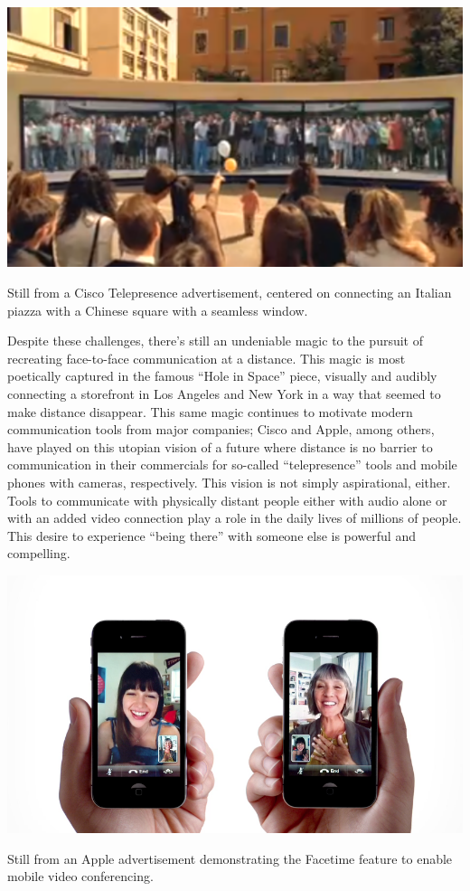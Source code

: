 \documentclass{tufte-handout}
\begin{document}
\begin{marginfigure}
	\includegraphics{figures/cisco-telepresence.png}
	\caption{Still from a Cisco Telepresence advertisement, centered on connecting an Italian piazza with a Chinese square with a seamless window.}
	\label{fig:cisco-telepresence}
\end{marginfigure}

Despite these challenges, there's still an undeniable magic to the pursuit of recreating face-to-face communication at a distance. This magic is most poetically captured in the famous ``Hole in Space'' \citep{HoleinSpace:1980vn} piece, visually and audibly connecting a storefront in Los Angeles and New York in a way that seemed to make distance disappear. This same magic continues to motivate modern communication tools from major companies; Cisco and Apple, among others, have played on this utopian vision of a future where distance is no barrier to communication in their commercials for so-called ``telepresence'' tools and mobile phones with cameras, respectively. This vision is not simply aspirational, either. Tools to communicate with physically distant people either with audio alone or with an added video connection play a role in the daily lives of millions of people. This desire to experience ``being there'' with someone else is powerful and compelling. 


\begin{marginfigure}
	\includegraphics{figures/iphone-face-to-face.png}
	\caption{Still from an Apple advertisement demonstrating the Facetime feature to enable mobile video conferencing.}
	\label{fig:facetime}
\end{marginfigure}
\end{document}
